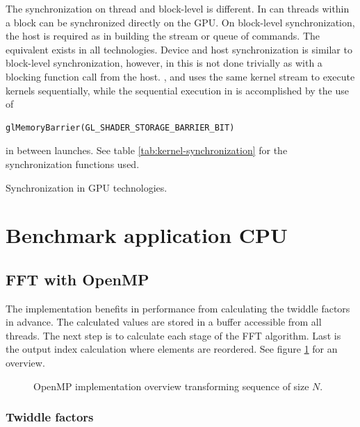 The synchronization on thread and block-level is different. In {\CU} can threads within a block can be synchronized directly on the \gls{GPU}. On block-level synchronization, the host is required as in building the stream or queue of commands. The equivalent exists in all technologies. Device and host synchronization is similar to block-level synchronization, however, in {\DX} this is not done trivially as with a blocking function call from the host. {\CU}, {\OCL} and {\DX} uses the same kernel stream to execute kernels sequentially, while the sequential execution in {\GL} is accomplished by the use of
\begin{lstlisting}
glMemoryBarrier(GL_SHADER_STORAGE_BARRIER_BIT)
\end{lstlisting}
in between launches. See table \ref{tab:kernel-synchronization} for the synchronization functions used.

\begin{table}[H]
	\centering
	
	\caption{Synchronization in GPU technologies.}
	\label{tab:kernel-synchronization}
\end{table}

\section{Benchmark application CPU}

\subsection{FFT with OpenMP}

The {\OMP} implementation benefits in performance from calculating the twiddle factors in advance. The calculated values are stored in a buffer accessible from all threads. The next step is to calculate each stage of the \gls{FFT} algorithm. Last is the output index calculation where elements are reordered. See figure \ref{fig:omp:overview} for an overview.

\begin{figure}
	\centering
	
	\caption{OpenMP implementation overview transforming sequence of size $N$.}
	\label{fig:omp:overview}
\end{figure}

\subsubsection{Twiddle factors}

